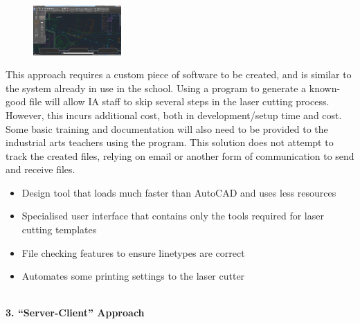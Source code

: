 \documentclass[oneside,openany,11pt,a4paper]{report}
\begin{document}
\begin{figure} \centering \includegraphics[width=0.3\textwidth]{sol2.png} \end{figure} 
This approach requires a custom piece of software to be created, and is similar to the system already in use in the school. Using a program to generate a known-good file will allow IA staff to skip several steps in the laser cutting process. However, this incurs additional cost, both in development/setup time and cost. Some basic training and documentation will also need to be provided to the industrial arts teachers using the program. This solution does not attempt to track the created files, relying on email or another form of communication to send and receive files.
	\begin{itemize}
		\itemsep0em
		\item Design tool that loads much faster than AutoCAD and uses less resources
		\item Specialised user interface that contains only the tools required for laser cutting templates
		\item File checking features to ensure linetypes are correct
		\item Automates some printing settings to the laser cutter
	\end{itemize}

\pagebreak
\noindent \textbf{\\ 3. “Server-Client” Approach }
\end{document}
